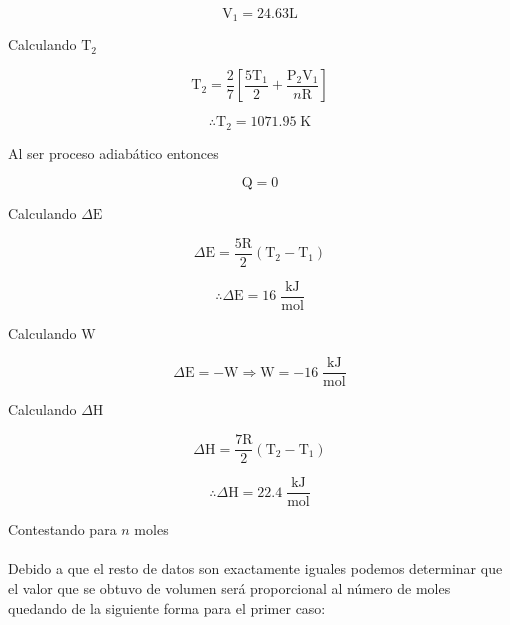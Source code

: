 \documentclass[12pt]{article}
\begin{document}
\begin{displaymath}
	\mathrm{V}_1=24.63\mathrm{L}
\end{displaymath}

Calculando $\mathrm{T}_2$

\begin{displaymath}
	\mathrm{T}_2=\frac{2}{7}\left[ \frac{5\mathrm{T}_1}{2}+\frac{\mathrm{P}_2\mathrm{V}_1}{n\mathrm{R}} \right]
\end{displaymath}

\begin{displaymath}
	\therefore\mathrm{T}_2=1071.95\;\mathrm{K}
\end{displaymath}

Al ser proceso adiabático entonces

\begin{displaymath}
	\mathrm{Q}=0
\end{displaymath}

Calculando $\Delta\mathrm{E}$

\begin{displaymath}
	\Delta\mathrm{E}=\frac{5\mathrm{R}}{2}(\mathrm{T}_2-\mathrm{T}_1)
\end{displaymath}

\begin{displaymath}
	\therefore\Delta\mathrm{E}=16\;\frac{\mathrm{kJ}}{\mathrm{mol}}
\end{displaymath}

Calculando $\mathrm{W}$

\begin{displaymath}
	\Delta\mathrm{E}=-\mathrm{W}\Rightarrow \mathrm{W}=-16\;\frac{\mathrm{kJ}}{\mathrm{mol}}
\end{displaymath}

Calculando $\Delta\mathrm{H}$

\begin{displaymath}
	\Delta\mathrm{H}=\frac{7\mathrm{R}}{2}(\mathrm{T}_2-\mathrm{T}_1)
\end{displaymath}

\begin{displaymath}
	\therefore\Delta\mathrm{H}=22.4\;\frac{\mathrm{kJ}}{\mathrm{mol}}
\end{displaymath}

\newpage

Contestando para $n$ moles\\
\\
Debido a que el resto de datos son exactamente iguales podemos determinar que el valor que se obtuvo de volumen será proporcional al número de moles quedando de la siguiente forma para el primer caso:
\end{document}
